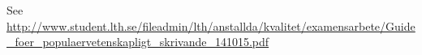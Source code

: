 See \url{http://www.student.lth.se/fileadmin/lth/anstallda/kvalitet/examensarbete/Guide_foer_populaervetenskapligt_skrivande_141015.pdf}
